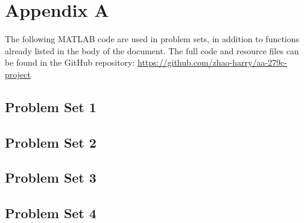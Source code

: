 \appendix

\section{Appendix A}
The following MATLAB code are used in problem sets, in addition to functions already listed in the body of the document. The full code and resource files can be found in the GitHub repository: \url{https://github.com/zhao-harry/aa-279c-project}

\subsection{Problem Set 1}


\subsection{Problem Set 2}








\subsection{Problem Set 3}




\subsection{Problem Set 4}
